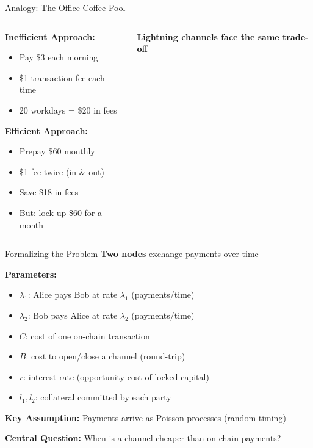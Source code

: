 \documentclass[aspectratio=169,12pt]{beamer}
\begin{document}
\begin{frame}{Analogy: The Office Coffee Pool}
\begin{columns}
\begin{column}{0.5\textwidth}
\textbf{Inefficient Approach:}
\begin{itemize}
    \item Pay \$3 each morning
    \item \$1 transaction fee each time
    \item 20 workdays = \$20 in fees
\end{itemize}

\vspace{0.3cm}
\textbf{Efficient Approach:}
\begin{itemize}
    \item Prepay \$60 monthly
    \item \$1 fee twice (in \& out)
    \item Save \$18 in fees
    \item But: lock up \$60 for a month
\end{itemize}
\end{column}

\begin{column}{0.5\textwidth}

\vspace{0.5cm}
\textbf{Lightning channels face the same trade-off}
\end{column}
\end{columns}
\end{frame}

\begin{frame}{Formalizing the Problem}
\textbf{Two nodes} exchange payments over time

\textbf{Parameters:}
\begin{itemize}
    \item $\lambda_1$: Alice pays Bob at rate $\lambda_1$ (payments/time)
    \item $\lambda_2$: Bob pays Alice at rate $\lambda_2$ (payments/time)
    \item $C$: cost of one on-chain transaction
    \item $B$: cost to open/close a channel (round-trip)
    \item $r$: interest rate (opportunity cost of locked capital)
    \item $l_1, l_2$: collateral committed by each party
\end{itemize}

\vspace{0.3cm}
\textbf{Key Assumption:} Payments arrive as Poisson processes (random timing)

\vspace{0.3cm}
\textbf{Central Question:} When is a channel cheaper than on-chain payments?
\end{frame}
\end{document}
